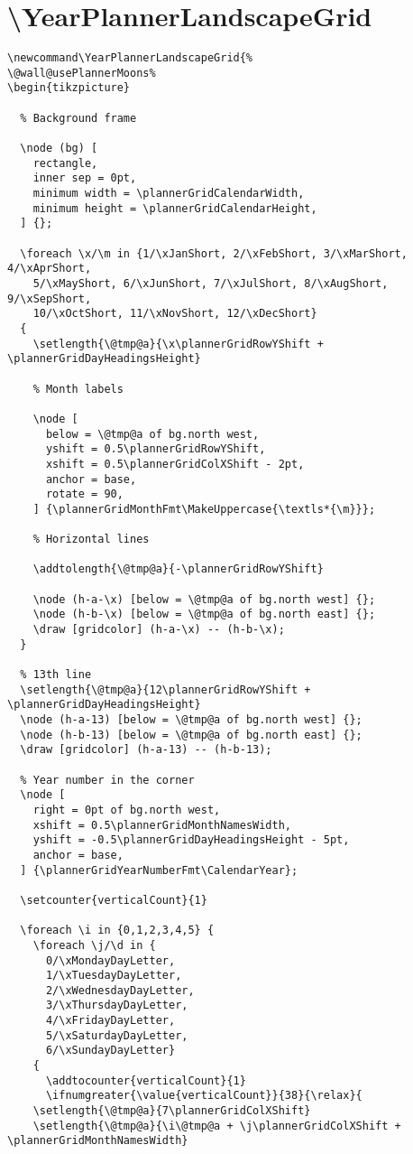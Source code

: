 \documentclass[11pt,oneside]{memoir-article}
\begin{document}
\section{\textbackslash YearPlannerLandscapeGrid}
\label{sec:orgebe96d0}

\begin{verbatim}
\newcommand\YearPlannerLandscapeGrid{%
\@wall@usePlannerMoons%
\begin{tikzpicture}

  % Background frame

  \node (bg) [
    rectangle,
    inner sep = 0pt,
    minimum width = \plannerGridCalendarWidth,
    minimum height = \plannerGridCalendarHeight,
  ] {};

  \foreach \x/\m in {1/\xJanShort, 2/\xFebShort, 3/\xMarShort, 4/\xAprShort,
    5/\xMayShort, 6/\xJunShort, 7/\xJulShort, 8/\xAugShort, 9/\xSepShort,
    10/\xOctShort, 11/\xNovShort, 12/\xDecShort}
  {
    \setlength{\@tmp@a}{\x\plannerGridRowYShift + \plannerGridDayHeadingsHeight}

    % Month labels

    \node [
      below = \@tmp@a of bg.north west,
      yshift = 0.5\plannerGridRowYShift,
      xshift = 0.5\plannerGridColXShift - 2pt,
      anchor = base,
      rotate = 90,
    ] {\plannerGridMonthFmt\MakeUppercase{\textls*{\m}}};

    % Horizontal lines

    \addtolength{\@tmp@a}{-\plannerGridRowYShift}

    \node (h-a-\x) [below = \@tmp@a of bg.north west] {};
    \node (h-b-\x) [below = \@tmp@a of bg.north east] {};
    \draw [gridcolor] (h-a-\x) -- (h-b-\x);
  }

  % 13th line
  \setlength{\@tmp@a}{12\plannerGridRowYShift + \plannerGridDayHeadingsHeight}
  \node (h-a-13) [below = \@tmp@a of bg.north west] {};
  \node (h-b-13) [below = \@tmp@a of bg.north east] {};
  \draw [gridcolor] (h-a-13) -- (h-b-13);

  % Year number in the corner
  \node [
    right = 0pt of bg.north west,
    xshift = 0.5\plannerGridMonthNamesWidth,
    yshift = -0.5\plannerGridDayHeadingsHeight - 5pt,
    anchor = base,
  ] {\plannerGridYearNumberFmt\CalendarYear};

  \setcounter{verticalCount}{1}

  \foreach \i in {0,1,2,3,4,5} {
    \foreach \j/\d in {
      0/\xMondayDayLetter,
      1/\xTuesdayDayLetter,
      2/\xWednesdayDayLetter,
      3/\xThursdayDayLetter,
      4/\xFridayDayLetter,
      5/\xSaturdayDayLetter,
      6/\xSundayDayLetter}
    {
      \addtocounter{verticalCount}{1}
      \ifnumgreater{\value{verticalCount}}{38}{\relax}{
	\setlength{\@tmp@a}{7\plannerGridColXShift}
	\setlength{\@tmp@a}{\i\@tmp@a + \j\plannerGridColXShift + \plannerGridMonthNamesWidth}


\end{verbatim}
\end{document}
